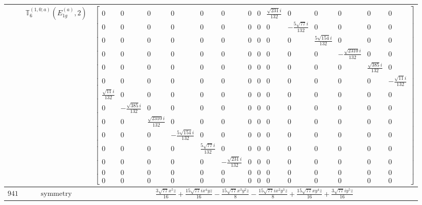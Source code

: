 \documentclass[fleqn,8pt,landscape]{jsarticle}
\begin{document}
\begin{longtable}{ccc}
$  $ & $ \mathbb{T}_{6}^{(1,0;a)}(E_{1g}^{(a)},2) $ & $ \begin{bmatrix} 0 & 0 & 0 & 0 & 0 & 0 & 0 & 0 & \frac{\sqrt{231} i}{132} & 0 & 0 & 0 & 0 & 0 \\ 0 & 0 & 0 & 0 & 0 & 0 & 0 & 0 & 0 & - \frac{5 \sqrt{77} i}{132} & 0 & 0 & 0 & 0 \\ 0 & 0 & 0 & 0 & 0 & 0 & 0 & 0 & 0 & 0 & \frac{5 \sqrt{154} i}{132} & 0 & 0 & 0 \\ 0 & 0 & 0 & 0 & 0 & 0 & 0 & 0 & 0 & 0 & 0 & - \frac{\sqrt{2310} i}{132} & 0 & 0 \\ 0 & 0 & 0 & 0 & 0 & 0 & 0 & 0 & 0 & 0 & 0 & 0 & \frac{\sqrt{385} i}{132} & 0 \\ 0 & 0 & 0 & 0 & 0 & 0 & 0 & 0 & 0 & 0 & 0 & 0 & 0 & - \frac{\sqrt{11} i}{132} \\ \frac{\sqrt{11} i}{132} & 0 & 0 & 0 & 0 & 0 & 0 & 0 & 0 & 0 & 0 & 0 & 0 & 0 \\ 0 & - \frac{\sqrt{385} i}{132} & 0 & 0 & 0 & 0 & 0 & 0 & 0 & 0 & 0 & 0 & 0 & 0 \\ 0 & 0 & \frac{\sqrt{2310} i}{132} & 0 & 0 & 0 & 0 & 0 & 0 & 0 & 0 & 0 & 0 & 0 \\ 0 & 0 & 0 & - \frac{5 \sqrt{154} i}{132} & 0 & 0 & 0 & 0 & 0 & 0 & 0 & 0 & 0 & 0 \\ 0 & 0 & 0 & 0 & \frac{5 \sqrt{77} i}{132} & 0 & 0 & 0 & 0 & 0 & 0 & 0 & 0 & 0 \\ 0 & 0 & 0 & 0 & 0 & - \frac{\sqrt{231} i}{132} & 0 & 0 & 0 & 0 & 0 & 0 & 0 & 0 \\ 0 & 0 & 0 & 0 & 0 & 0 & 0 & 0 & 0 & 0 & 0 & 0 & 0 & 0 \\ 0 & 0 & 0 & 0 & 0 & 0 & 0 & 0 & 0 & 0 & 0 & 0 & 0 & 0 \end{bmatrix} $ \\ \hline
$ 941 $ & $ \text{symmetry} $ & $ \frac{3 \sqrt{77} x^{5} z}{16} + \frac{15 \sqrt{77} i x^{4} y z}{16} - \frac{15 \sqrt{77} x^{3} y^{2} z}{8} - \frac{15 \sqrt{77} i x^{2} y^{3} z}{8} + \frac{15 \sqrt{77} x y^{4} z}{16} + \frac{3 \sqrt{77} i y^{5} z}{16} $ \\

\end{longtable}
\end{document}
